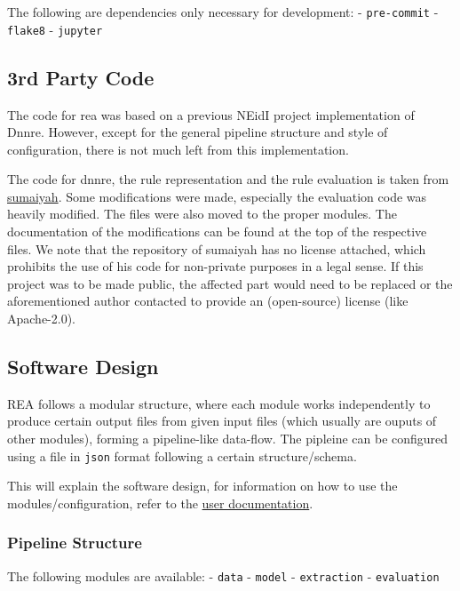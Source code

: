 \documentclass[
]{article}
\begin{document}
The following are dependencies only necessary for development: -
\texttt{pre-commit} - \texttt{flake8} - \texttt{jupyter}

\hypertarget{rd-party-code}{%
\subsection{3rd Party Code}\label{rd-party-code}}

The code for rea was based on a previous NEidI project implementation of
Dnnre. However, except for the general pipeline structure and style of
configuration, there is not much left from this implementation.

The code for dnnre, the rule representation and the rule evaluation is
taken from \href{https://github.com/sumaiyah/DNN-RE/}{sumaiyah}. Some
modifications were made, especially the evaluation code was heavily
modified. The files were also moved to the proper modules. The
documentation of the modifications can be found at the top of the
respective files. We note that the repository of sumaiyah has no license
attached, which prohibits the use of his code for non-private purposes
in a legal sense. If this project was to be made public, the affected
part would need to be replaced or the aforementioned author contacted to
provide an (open-source) license (like Apache-2.0).

\hypertarget{software-design}{%
\subsection{Software Design}\label{software-design}}

REA follows a modular structure, where each module works independently
to produce certain output files from given input files (which usually
are ouputs of other modules), forming a pipeline-like data-flow. The
pipleine can be configured using a file in \texttt{json} format
following a certain structure/schema.

This will explain the software design, for information on how to use the
modules/configuration, refer to the \href{../40_User_Doc/README.md}{user
documentation}.

\hypertarget{pipeline-structure}{%
\subsubsection{Pipeline Structure}\label{pipeline-structure}}

The following modules are available: - \texttt{data} - \texttt{model} -
\texttt{extraction} - \texttt{evaluation}
\end{document}
